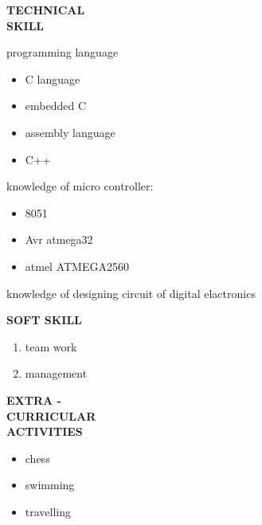 \documentclass{article}
\begin{document}
  \begin{flushleft}
  	\vspace{0.4in}
  	\textbf{TECHNICAL  \\ SKILL}
  	\begin{itemize}
  		\vspace{-0.45in}
  		\addtolength{\itemindent}{1.359in}
  		
  		\item  programming language
  		{\begin{itemize}
  				\addtolength{\itemindent}{1.359in}
  				\item C language
  				\item embedded C
  				\item assembly language
  				\item C++
  				
  			\end{itemize}
  		}  
  		\item knowledge of  micro controller:
  		{\begin{itemize}
  				\addtolength{\itemindent}{1.359in}
  				\item 8051 
  				\item Avr atmega32
  				\item atmel ATMEGA2560
  				
  			\end{itemize}
  			\item knowledge of designing circuit of digital elactronics 
  		}  
  		
  	\end{itemize}
  \end{flushleft}

	\begin{flushleft} 
		
		\vspace{0.4in}
		\textbf{SOFT SKILL}
		\begin{enumerate}
			\vspace{-0.30in}
			\addtolength{\itemindent}{1.359in}
			\item team work
			\item management
			
			
		\end{enumerate}
	\end{flushleft}

	
	\begin{flushleft} 
		
		
		
		\vspace{0.4in}
		\textbf{EXTRA - \\CURRICULAR \\ACTIVITIES }
		\begin{itemize}
			\vspace{-0.65in}
			\addtolength{\itemindent}{1.359in}
			\item  chess
			\item swimming
			\item travelling
			
			
		\end{itemize}
	\end{flushleft}
\end{document}
